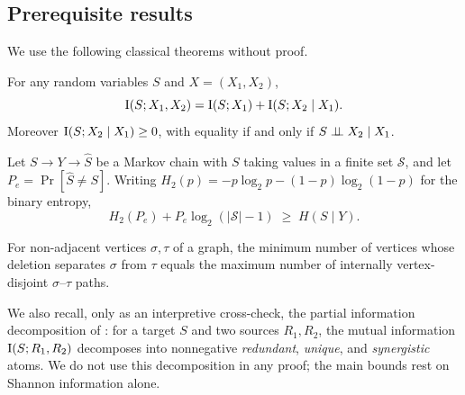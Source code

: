 \subsection{Prerequisite results}

We use the following classical theorems without proof.

\begin{theorem}
\label{thm:chainrule}
For any random variables $S$ and $X=(X_1,X_2)$,
\[
  \operatorname{I}(S;X_1,X_2)=\operatorname{I}(S;X_1)+\operatorname{I}(S;X_2\mid X_1).
\]
Moreover $\operatorname{I}(S;X_2\mid X_1)\ge 0$, with equality if and only if $S\perp\!\!\!\perp X_2\mid X_1$.
\end{theorem}

\begin{theorem}
\label{thm:fano}
Let $S\to Y\to\widehat{S}$ be a Markov chain with $S$ taking values in a finite set
$\mathcal{S}$, and let $P_e=\Pr[\widehat{S}\neq S]$. Writing $H_2(p)=-p\log_2 p-(1-p)\log_2(1-p)$
for the binary entropy,
\[
  H_2(P_e)+P_e\log_2(\lvert\mathcal{S}\rvert-1)\;\ge\;H(S\mid Y).
\]
\end{theorem}

\begin{theorem}
\label{thm:menger}
For non-adjacent vertices $\sigma,\tau$ of a graph, the minimum number of vertices
whose deletion separates $\sigma$ from $\tau$ equals the maximum number of internally
vertex-disjoint $\sigma$--$\tau$ paths.
\end{theorem}

We also recall, only as an interpretive cross-check, the partial information
decomposition of \cite{williams2010pid}: for a target $S$ and two sources $R_1,R_2$,
the mutual information $\operatorname{I}(S;R_1,R_2)$ decomposes into nonnegative \emph{redundant},
\emph{unique}, and \emph{synergistic} atoms. We do not use this decomposition in any
proof; the main bounds rest on Shannon information alone.
